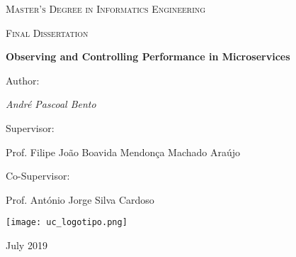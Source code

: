 \begin{titlepage}
	\centering
	{\scshape\LARGE Master’s Degree in Informatics Engineering \par}

	\vspace{0.2cm}
	{\scshape Final Dissertation\par}

	\vspace{1.5cm}
	{\huge\bfseries Observing and Controlling Performance in Microservices\par}

	\vspace{2cm}
	{Author:\par \Large\itshape André Pascoal Bento\par}

	\vfill
	Supervisor:\par
	\large Prof. Filipe João Boavida Mendonça Machado Araújo\par

	\vspace{0.5cm}
	Co-Supervisor:\par
	\large Prof. António Jorge Silva Cardoso\par

	\texttt{[image: uc\_logotipo.png]}\par

	\vspace{0.5cm}
	\vfill

	{\Large July 2019\par}
\end{titlepage}